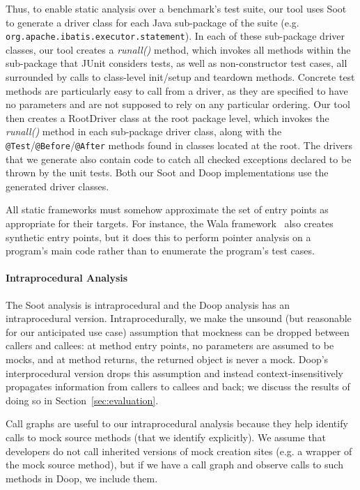Thus, to enable static analysis over a benchmark's test suite, our tool uses Soot to generate a driver class for each Java sub-package of the suite (e.g. \texttt{org.apache.ibatis.executor.statement}). In each of these sub-package driver classes, our tool creates a \textit{runall()} method, which invokes all methods within the sub-package that JUnit considers tests, as well as non-constructor test cases, all surrounded by calls to class-level init/setup and teardown methods. Concrete test methods are particularly easy to call from a driver, as they are specified to have no parameters and are not supposed to rely on any particular ordering. 
Our tool then creates a RootDriver class at the root package level, which invokes the \textit{runall()} method in each sub-package driver class, along with the \texttt{@Test}/\texttt{@Before}/\texttt{@After} methods found in classes located at the root. The drivers that we generate also contain code to catch all checked exceptions declared to be thrown by the unit tests. Both our Soot and Doop implementations use the generated driver classes.

All static frameworks must somehow approximate the set of entry points as appropriate for their targets. For instance, the Wala framework~\cite{wala19:_t} also creates synthetic entry points, but it does this to perform pointer analysis on a program's main code rather than to enumerate the program's test cases.

\paragraph{Intraprocedural Analysis} The Soot analysis is intraprocedural and the Doop analysis has an intraprocedural version. Intraprocedurally, we make the unsound (but reasonable for our anticipated use case) assumption that mockness can be dropped between callers and callees: at method entry points, no parameters are assumed to be mocks, and at method returns, the returned object is never a mock. Doop's interprocedural version drops this assumption and instead context-insensitively propagates information from callers to callees and back; we discuss the results of doing so in Section~\ref{sec:evaluation}.

Call graphs are useful to our intraprocedural analysis because they help identify calls to mock source methods (that we identify explicitly). We assume that developers do not call inherited versions of mock creation sites (e.g. a wrapper of the mock source method), but if we have a call graph and observe calls to such methods in Doop, we include them.

